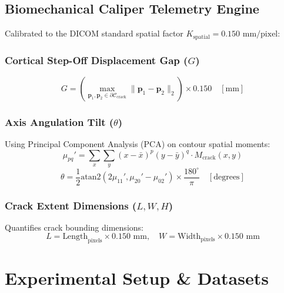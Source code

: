 \documentclass[3p,twocolumn]{elsarticle}
\begin{document}
\subsection{Biomechanical Caliper Telemetry Engine}
Calibrated to the DICOM standard spatial factor $K_{\text{spatial}} = 0.150\text{ mm/pixel}$:

\subsubsection{Cortical Step-Off Displacement Gap ($G$)}
\begin{equation}
    G = \left(\max_{\mathbf{p}_1, \mathbf{p}_2 \in \partial \mathcal{C}_{\text{crack}}} \|\mathbf{p}_1 - \mathbf{p}_2\|_2\right) \times 0.150 \quad [\text{mm}]
\end{equation}

\subsubsection{Axis Angulation Tilt ($\theta$)}
Using Principal Component Analysis (PCA) on contour spatial moments:
\begin{equation}
    \mu_{pq}' = \sum_{x}\sum_{y} (x - \bar{x})^p (y - \bar{y})^q \cdot M_{\text{crack}}(x, y)
\end{equation}
\begin{equation}
    \theta = \frac{1}{2} \text{atan2}\left(2\mu_{11}', \mu_{20}' - \mu_{02}'\right) \times \frac{180^\circ}{\pi} \quad [\text{degrees}]
\end{equation}

\subsubsection{Crack Extent Dimensions ($L, W, H$)}
Quantifies crack bounding dimensions:
\begin{equation}
    L = \text{Length}_{\text{pixels}} \times 0.150\text{ mm}, \quad W = \text{Width}_{\text{pixels}} \times 0.150\text{ mm}
\end{equation}

\section{Experimental Setup \& Datasets}
\end{document}
